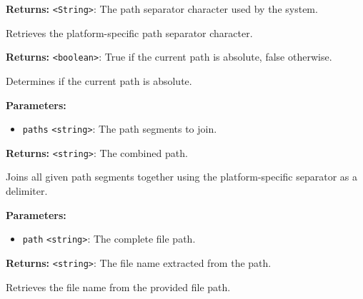 \documentclass[12pt,a4paper]{article}
\begin{document}
\vspace{5mm}
\noindent {}


\noindent \textbf{Returns:} \texttt{<String>}: The path separator character used by the system.

\noindent Retrieves the platform-specific path separator character.

\vspace{5mm}
\noindent {}


\noindent \textbf{Returns:} \texttt{<boolean>}: True if the current path is absolute, false otherwise.

\noindent Determines if the current path is absolute.

\vspace{5mm}
\noindent {}


\noindent \textbf{Parameters:}
\begin{itemize}
  \item \texttt{paths} \texttt{<string>}: The path segments to join.
\end{itemize}

\noindent \textbf{Returns:} \texttt{<string>}: The combined path.

\noindent Joins all given path segments together using the platform-specific separator as a delimiter.

\vspace{5mm}
\noindent {}


\noindent \textbf{Parameters:}
\begin{itemize}
  \item \texttt{path} \texttt{<string>}: The complete file path.
\end{itemize}

\noindent \textbf{Returns:} \texttt{<string>}: The file name extracted from the path.

\noindent Retrieves the file name from the provided file path.
\end{document}
